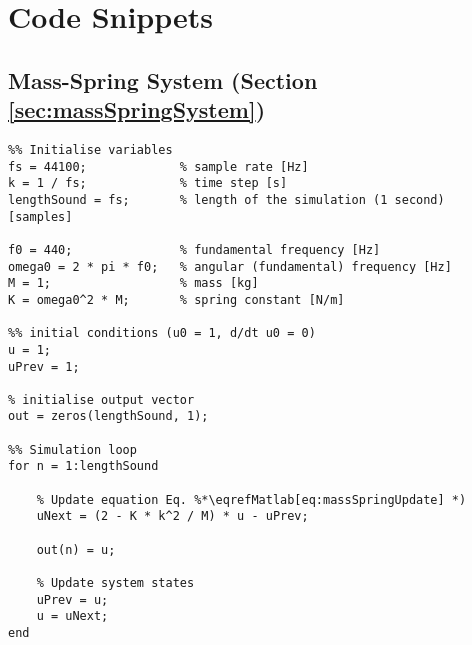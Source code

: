 \chapter{Code Snippets}
\renewcommand\thesection{\thechapter.\arabic{section}}

\section{Mass-Spring System (Section \ref{sec:massSpringSystem})}\label{app:massSpringCode}

\setlstMAT
\begin{lstlisting}
%% Initialise variables
fs = 44100;             % sample rate [Hz]
k = 1 / fs;             % time step [s]
lengthSound = fs;       % length of the simulation (1 second) [samples]

f0 = 440;               % fundamental frequency [Hz]
omega0 = 2 * pi * f0;   % angular (fundamental) frequency [Hz]
M = 1;                  % mass [kg]
K = omega0^2 * M;       % spring constant [N/m]

%% initial conditions (u0 = 1, d/dt u0 = 0)
u = 1;                  
uPrev = 1;

% initialise output vector
out = zeros(lengthSound, 1);

%% Simulation loop
for n = 1:lengthSound
    
    % Update equation Eq. %*\eqrefMatlab[eq:massSpringUpdate] *)
    uNext = (2 - K * k^2 / M) * u - uPrev; 
    
    out(n) = u;
    
    % Update system states
    uPrev = u;
    u = uNext;
end    
\end{lstlisting}

